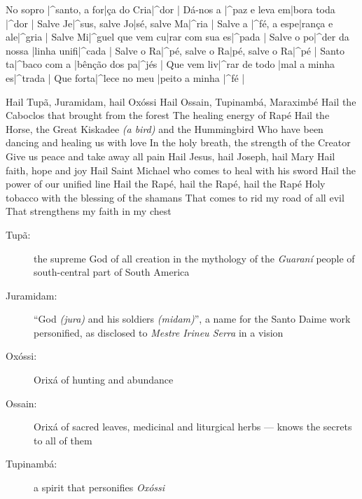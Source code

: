 \beginchorus{}
    No sopro |^santo, a for|ça do Cria|^dor | \e
    Dá-nos a |^paz e leva em|bora toda |^dor | \e
  \endchorus
  \beginverse{}
    Salve Je|^sus, salve Jo|sé, salve Ma|^ria | \e
    Salve a |^fé, a espe|rança e ale|^gria | \e
  \endverse\glueverses
  \beginchorus{}
    Salve Mi|^guel que vem cu|rar com sua es|^pada | \e
    Salve o po|^der da nossa |linha unifi|^cada | \e
  \endchorus
  \beginverse{}
    Salve o Ra|^pé, salve o Ra|pé, salve o Ra|^pé | \e
    Santo ta|^baco com a |bênção dos pa|^jés | \e
  \endverse\glueverses
  \beginchorus{}
    Que vem liv|^rar de todo |mal a minha es|^trada | \e
    Que forta|^lece no meu |peito a minha |^fé | \e
  \endchorus
  \begin{translation}
    Hail Tupã, Juramidam, hail Oxóssi
    Hail Ossain, Tupinambá, Maraximbé
    Hail the Caboclos that brought from the forest
    The healing energy of Rapé
    \nextverse
    Hail the Horse, the Great Kiskadee \emph{(a bird)} and the Hummingbird
    Who have been dancing and healing us with love
    In the holy breath, the strength of the Creator
    Give us peace and take away all pain
    \nextverse
    Hail Jesus, hail Joseph, hail Mary
    Hail faith, hope and joy
    Hail Saint Michael who comes to heal with his sword
    Hail the power of our unified line
    \nextverse
    Hail the Rapé, hail the Rapé, hail the Rapé
    Holy tobacco with the blessing of the shamans
    That comes to rid my road of all evil
    That strengthens my faith in my chest
  \end{translation}
  \begin{explanation}
    \begin{description}
      \item[Tupã:] the supreme God of all creation in the mythology of the
        \emph{Guaraní} people of south-central part of South America
      \item[Juramidam:] ``God \emph{(jura)} and his soldiers \emph{(midam)}'',
        a name for the Santo Daime work personified, as disclosed to
        \emph{Mestre Irineu Serra} in a vision
      \item[Oxóssi:] Orixá of hunting and abundance
      \item[Ossain:] Orixá of sacred leaves, medicinal and liturgical herbs ---
        knows the secrets to all of them
      \item[Tupinambá:] a spirit that personifies \emph{Oxóssi}
    \end{description}
  \end{explanation}
\endsong



